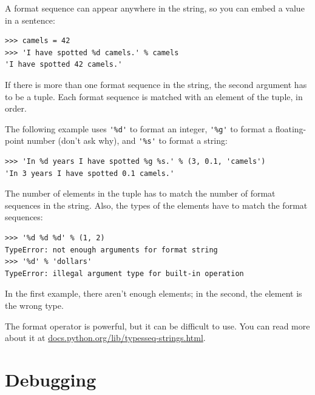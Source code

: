 \documentclass[10pt]{book}
\begin{document}
A format sequence can appear anywhere in the string,
so you can embed a value in a sentence:

\beforeverb
\begin{verbatim}
>>> camels = 42
>>> 'I have spotted %d camels.' % camels
'I have spotted 42 camels.'
\end{verbatim}
\afterverb
%
If there is more than one format sequence in the string,
the second argument has to be a tuple.  Each format sequence is
matched with an element of the tuple, in order.

The following example uses \verb"'%d'" to format an integer,
\verb"'%g'" to format
a floating-point number (don't ask why), and \verb"'%s'" to format
a string:

\beforeverb
\begin{verbatim}
>>> 'In %d years I have spotted %g %s.' % (3, 0.1, 'camels')
'In 3 years I have spotted 0.1 camels.'
\end{verbatim}
\afterverb
%
The number of elements in the tuple has to match the number
of format sequences in the string.  Also, the types of the
elements have to match the format sequences:


\beforeverb
\begin{verbatim}
>>> '%d %d %d' % (1, 2)
TypeError: not enough arguments for format string
>>> '%d' % 'dollars'
TypeError: illegal argument type for built-in operation
\end{verbatim}
\afterverb
%
In the first example, there aren't enough elements; in the
second, the element is the wrong type.

The format operator is powerful, but it can be difficult to use.  You
can read more about it at
\url{docs.python.org/lib/typesseq-strings.html}.




\section{Debugging}
\end{document}
